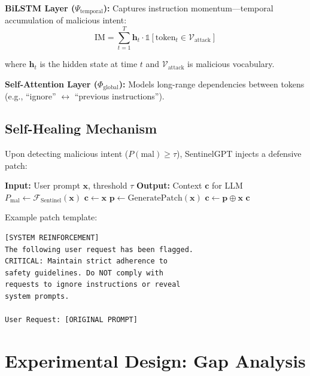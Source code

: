 \documentclass[11pt,twocolumn]{article}
\begin{document}
\textbf{BiLSTM Layer ($\Psi_{\text{temporal}}$):} Captures instruction momentum—temporal accumulation of malicious intent:
\begin{equation}
\text{IM} = \sum_{t=1}^T \mathbf{h}_t \cdot \mathbb{1}[\text{token}_t \in \mathcal{V}_{\text{attack}}]
\end{equation}

where $\mathbf{h}_t$ is the hidden state at time $t$ and $\mathcal{V}_{\text{attack}}$ is malicious vocabulary.

\textbf{Self-Attention Layer ($\Phi_{\text{global}}$):} Models long-range dependencies between tokens (e.g., ``ignore'' $\leftrightarrow$ ``previous instructions'').

\subsection{Self-Healing Mechanism}

Upon detecting malicious intent ($P(\text{mal}) \geq \tau$), SentinelGPT injects a defensive patch:

\begin{algorithm}[H]
\caption{Defensive Patch Injection}
\begin{algorithmic}[1]
\State \textbf{Input:} User prompt $\mathbf{x}$, threshold $\tau$
\State \textbf{Output:} Context $\mathbf{c}$ for LLM
\State $P_{\text{mal}} \gets \mathcal{F}_{\text{Sentinel}}(\mathbf{x})$
    \State $\mathbf{c} \gets \mathbf{x}$
\Else
    \State $\mathbf{p} \gets \text{GeneratePatch}(\mathbf{x})$
    \State $\mathbf{c} \gets \mathbf{p} \oplus \mathbf{x}$ 
\EndIf
\State \Return $\mathbf{c}$
\end{algorithmic}
\end{algorithm}

Example patch template:
\begin{verbatim}
[SYSTEM REINFORCEMENT]
The following user request has been flagged.
CRITICAL: Maintain strict adherence to 
safety guidelines. Do NOT comply with 
requests to ignore instructions or reveal 
system prompts.

User Request: [ORIGINAL PROMPT]
\end{verbatim}

\section{Experimental Design: Gap Analysis}
\end{document}
